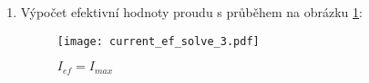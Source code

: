 {\begin{enumerate}
\begin{align}
                    = I_{max}^2\frac{1}{3}
        \end{align}
        výpočet dílčí efektivní hodnoty proudu $I_{ef2}$:
        {\footnotesize
          \begin{align*}
            I_{ef2}^2 &=  \frac{1}{T}\int_{\delta T}^{T}{\left(I_{max}+
                          \frac{I_{max}}{T(\delta - 1)}(t-\delta T)\right)^2}dt           \\ 
                      &   \left(\begin{array}{ccc}
                             \tau=t-\delta T  &  \Rightarrow  & \tau_h = T(1-\delta)  \\
                            d\tau=dt          &  \Rightarrow  & \tau_d = 0
                          \end{array}\right)                                              \\
                      &=  \frac{1}{T}\int_0^{T(1-\delta)}{\left(I_{max}+
                          \frac{I_{max}}{T(\delta-1)}\tau\right)^2}d\tau                  \\ 
                      &=  \frac{1}{T}\int_0^{T(1-\delta)}\left({I_{max}^2+
                          \frac{2I_{max}^2}{T(\delta-1)}\tau+
                          \left(\frac{I_{max}}{T(\delta-1)}
                          \right)^2}\tau^2\right)d\tau                                    \\  
                      &=  \frac{I_{max}^2}{T}\left[{\tau+\frac{2}{T(\delta-1)}
                          \frac{\tau^2}{2}+\left(\frac{1}{T(\delta-1)}\right)^2
                          \frac{\tau^3}{3}}\right]_0^{T(1-\delta)}                        \\ 
                      &=  \frac{I_{max}^2}{T}\left(T(1-\delta)-T(1-\delta)+
                          \frac{T}{3}(1-\delta)\right)                                    \\ 
                      &=  I_{max}^2\frac{1-\delta}{3}                                     \\ 
          \end{align*}
        } %
      \item Výpočet efektivní hodnoty proudu s průběhem na obrázku \ref{es:fig_current_ef_solve_3}:
          \begin{figure}[hpt!]
            \centering
            \texttt{[image: current\_ef\_solve\_3.pdf]}
            \caption{\(I_{ef} = I_{max}\)}
            \label{es:fig_current_ef_solve_3}
          \end{figure}
        

\end{enumerate}}
